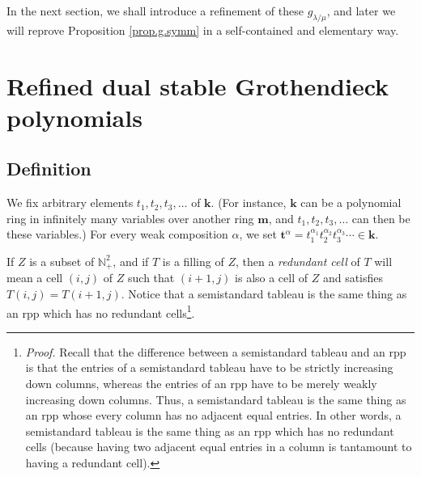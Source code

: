 \documentclass[numbers=enddot,12pt,final,onecolumn,notitlepage]{scrartcl}%
\theoremstyle{definition}
\newenvironment{vershort}{}{}
\begin{document}
In the next section, we shall introduce a refinement of these $g_{\lambda/\mu
}$, and later we will reprove Proposition \ref{prop.g.symm} in a
self-contained and elementary way.

\section{\label{sect.def}Refined dual stable Grothendieck polynomials}

\subsection{Definition}

We fix arbitrary elements $t_{1},t_{2},t_{3},\ldots$ of $\mathbf{k}$. (For
instance, $\mathbf{k}$ can be a polynomial ring in infinitely many variables
over another ring $\mathbf{m}$, and $t_{1},t_{2},t_{3},\ldots$ can then be
these variables.) For every weak composition $\alpha$, we set $\mathbf{t}%
^{\alpha}=t_{1}^{\alpha_{1}}t_{2}^{\alpha_{2}}t_{3}^{\alpha_{3}}\cdots
\in\mathbf{k}$.

\begin{vershort}
If $Z$ is a subset of $\mathbb{N}_{+}^{2}$, and if $T$ is a filling of $Z$,
then a \textit{redundant cell} of $T$ will mean a cell $\left(  i,j\right)  $
of $Z$ such that $\left(  i+1,j\right)  $ is also a cell of $Z$ and satisfies
$T\left(  i,j\right)  =T\left(  i+1,j\right)  $. Notice that a semistandard
tableau is the same thing as an rpp which has no redundant
cells\footnote{\textit{Proof.} Recall that the difference between a
semistandard tableau and an rpp is that the entries of a semistandard tableau
have to be strictly increasing down columns, whereas the entries of an rpp
have to be merely weakly increasing down columns. Thus, a semistandard tableau
is the same thing as an rpp whose every column has no adjacent equal entries.
In other words, a semistandard tableau is the same thing as an rpp which has
no redundant cells (because having two adjacent equal entries in a column is
tantamount to having a redundant cell).}.
\end{vershort}
\end{document}
